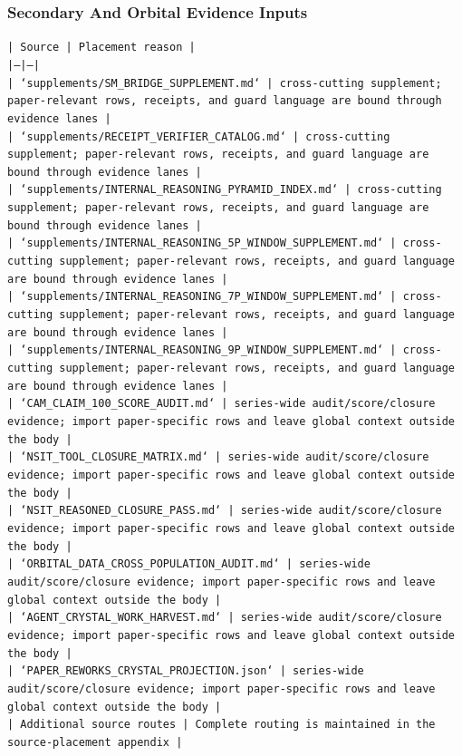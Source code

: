 \documentclass[11pt]{article}
\begin{document}
\subsubsection*{Secondary And Orbital Evidence Inputs}

\noindent\texttt{| Source | Placement reason |}\\
\noindent\texttt{|---|---|}\\
\noindent\texttt{| `supplements/SM\_BRIDGE\_SUPPLEMENT.md` | cross-cutting supplement; paper-relevant rows, receipts, and guard language are bound through evidence lanes |}\\
\noindent\texttt{| `supplements/RECEIPT\_VERIFIER\_CATALOG.md` | cross-cutting supplement; paper-relevant rows, receipts, and guard language are bound through evidence lanes |}\\
\noindent\texttt{| `supplements/INTERNAL\_REASONING\_PYRAMID\_INDEX.md` | cross-cutting supplement; paper-relevant rows, receipts, and guard language are bound through evidence lanes |}\\
\noindent\texttt{| `supplements/INTERNAL\_REASONING\_5P\_WINDOW\_SUPPLEMENT.md` | cross-cutting supplement; paper-relevant rows, receipts, and guard language are bound through evidence lanes |}\\
\noindent\texttt{| `supplements/INTERNAL\_REASONING\_7P\_WINDOW\_SUPPLEMENT.md` | cross-cutting supplement; paper-relevant rows, receipts, and guard language are bound through evidence lanes |}\\
\noindent\texttt{| `supplements/INTERNAL\_REASONING\_9P\_WINDOW\_SUPPLEMENT.md` | cross-cutting supplement; paper-relevant rows, receipts, and guard language are bound through evidence lanes |}\\
\noindent\texttt{| `CAM\_CLAIM\_100\_SCORE\_AUDIT.md` | series-wide audit/score/closure evidence; import paper-specific rows and leave global context outside the body |}\\
\noindent\texttt{| `NSIT\_TOOL\_CLOSURE\_MATRIX.md` | series-wide audit/score/closure evidence; import paper-specific rows and leave global context outside the body |}\\
\noindent\texttt{| `NSIT\_REASONED\_CLOSURE\_PASS.md` | series-wide audit/score/closure evidence; import paper-specific rows and leave global context outside the body |}\\
\noindent\texttt{| `ORBITAL\_DATA\_CROSS\_POPULATION\_AUDIT.md` | series-wide audit/score/closure evidence; import paper-specific rows and leave global context outside the body |}\\
\noindent\texttt{| `AGENT\_CRYSTAL\_WORK\_HARVEST.md` | series-wide audit/score/closure evidence; import paper-specific rows and leave global context outside the body |}\\
\noindent\texttt{| `PAPER\_REWORKS\_CRYSTAL\_PROJECTION.json` | series-wide audit/score/closure evidence; import paper-specific rows and leave global context outside the body |}\\
\noindent\texttt{| Additional source routes | Complete routing is maintained in the source-placement appendix |}\\
\end{document}

